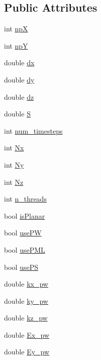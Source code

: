 \subsection*{Public Attributes}
\begin{DoxyCompactItemize}
\item 
int \hyperlink{classreader_aee211b49773f5df67ee1c9e97571233f}{npX}
\item 
int \hyperlink{classreader_a1c0a1faf8270b0ee3bc10587e333aee2}{npY}
\item 
double \hyperlink{classreader_a1c09a3c058c59f01255f23f0f566e36d}{dx}
\item 
double \hyperlink{classreader_a5285f6d49ca59e506700250462ea16fc}{dy}
\item 
double \hyperlink{classreader_a552c17427312cbdbabca1567bdf84939}{dz}
\item 
double \hyperlink{classreader_a3a22ddf8074dc65b8f1908bab38c2ea3}{S}
\item 
int \hyperlink{classreader_ae4cc3c397b3374a3f44d674cbe07b02d}{num\+\_\+timesteps}
\item 
int \hyperlink{classreader_a358575a5554cef675bc5846e68b4fe19}{Nx}
\item 
int \hyperlink{classreader_adbd1ed384f30c9dea7734fdf0e83e0a2}{Ny}
\item 
int \hyperlink{classreader_a87dde1a2d482102671811dd837ddd3b8}{Nz}
\item 
int \hyperlink{classreader_a99cc611dcacff82a10bc64af27846d67}{n\+\_\+threads}
\item 
bool \hyperlink{classreader_a7cc8fcbdd1e92c55a2dd1fafcfe957e9}{is\+Planar}
\item 
bool \hyperlink{classreader_a64a1149ced0bd0ea1ba3b0818e2ba27a}{use\+PW}
\item 
bool \hyperlink{classreader_a83041337efd59312d3611c445531c5be}{use\+P\+ML}
\item 
bool \hyperlink{classreader_aaefb82848b0d32b29e3a03c949019e91}{use\+PS}
\item 
double \hyperlink{classreader_af025b854353d36ff0e68eebe6c6de4c9}{kx\+\_\+pw}
\item 
double \hyperlink{classreader_ad4c50ac42cf11005e68881c8ee2db449}{ky\+\_\+pw}
\item 
double \hyperlink{classreader_ab1473fac73efae3f8317fc290d4a1f52}{kz\+\_\+pw}
\item 
double \hyperlink{classreader_aacebdb2fd7aa22550a4d650165af5bdb}{Ex\+\_\+pw}
\item 
double \hyperlink{classreader_a2daf1aa46ce532cb6850061b4ab8450e}{Ey\+\_\+pw}

\end{DoxyCompactItemize}
